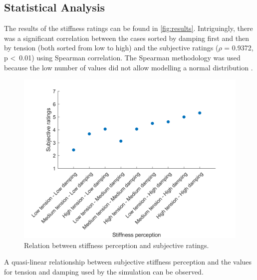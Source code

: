     \subsection{Statistical Analysis}
    The results of the stiffness ratings can be found in \autoref{fig:results}. Intriguingly, there was a significant correlation between the cases sorted by damping first and then by tension (both sorted from low to high) and the subjective ratings ($\rho$ = 0.9372, p \textless \ 0.01) using Spearman correlation. The Spearman methodology was used because the low number of values did not allow modelling a normal distribution \cite{Kirk2007}.%
    \begin{figure}[t]
        \centering
    \includegraphics[width=\paperFigWidth\textwidth]{figures/corr_anal}
    \caption{Relation between stiffness perception and subjective ratings.}
    \centering
    \label{fig:results}
    \end{figure} 
    A quasi-linear relationship between subjective stiffness perception and the values for tension and damping used by the simulation can be observed. %
    
